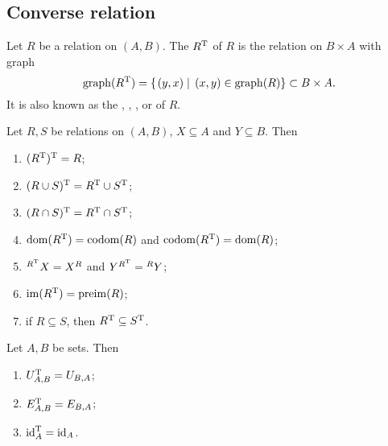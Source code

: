 \subsection{Converse relation}
\begin{definition}
Let $R$ be a relation on $(A, B)$. The  $R^{\mathrm{T}}$ of $R$ is the relation on $B\times A$ with graph
\[ \operatorname{graph}(R^{\mathrm{T}}) = \left\{\left. (y,x) \;\right|\; (x,y)\in \operatorname{graph}(R) \right\} \subset B\times A. \]
It is also known as the , , ,  or  of $R$.
\end{definition}

\begin{lemma}
Let $R,S$ be relations on $(A, B)$, $X\subseteq A$ and $Y\subseteq B$. Then
\begin{enumerate}
\item $(R^{\mathrm{T}})^{\mathrm{T}} = R$;
\item $(R \cup S)^{\mathrm{T}} = R^{\mathrm{T}} \cup S^{\mathrm{T}}$;
\item $(R \cap S)^{\mathrm{T}} = R^{\mathrm{T}} \cap S^{\mathrm{T}}$;
\item $\operatorname{dom}(R^{\mathrm{T}}) = \operatorname{codom}(R)$ and $\operatorname{codom}(R^{\mathrm{T}}) = \operatorname{dom}(R)$;
\item $^{R^{\mathrm{T}}}X = X^R$ and $Y^{R^{\mathrm{T}}} = {^RY}$;
\item $\operatorname{im}(R^{\mathrm{T}}) = \operatorname{preim}(R)$;
\item if $R\subseteq S$, then $R^{\mathrm{T}} \subseteq S^{\mathrm{T}}$.
\end{enumerate}
\end{lemma}

\begin{lemma}
Let $A,B$ be sets. Then
\begin{enumerate}
\item $U_{A,B}^{\mathrm{T}} = U_{B,A}$;
\item $E_{A,B}^{\mathrm{T}} = E_{B,A}$;
\item $\operatorname{id}_A^{\mathrm{T}} = \operatorname{id}_A$.
\end{enumerate}
\end{lemma}

